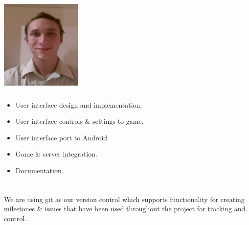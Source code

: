 \documentclass[letterpaper]{article}
\begin{document}
		\begin{minipage}[l]{0.23\textwidth}
			\begin{flushleft}
				\includegraphics[width=40mm,height=50mm]{Members/Gerhard.jpg}
			\end{flushleft}
		\end{minipage}
		\begin{minipage}[r]{0.75\textwidth}
				\begin{itemize}
					\item User interface design and implementation.
					\item User interface controls \& settings to game.
					\item User interface port to Android.
					\item Game \& server integration.
					\item Documentation.
				\end{itemize}
		\end{minipage}
		
		\vspace{0.2in}
	\section*{\colorbox{black}{}} 
		\vspace{0.1in}
		
		We are using git as our version control which supports functionality for creating milestones \& issues that have been used throughout the project for tracking and control.
			
\end{document}
